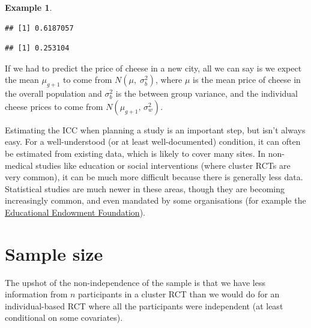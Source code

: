 \documentclass[
  openany]{book}
\newenvironment{Shaded}{\begin{snugshade}}{\end{snugshade}}
\newcommand{\FunctionTok}[1]{\textcolor[rgb]{0.13,0.29,0.53}{\textbf{#1}}}
\newcommand{\NormalTok}[1]{#1}
\newcommand{\OtherTok}[1]{\textcolor[rgb]{0.56,0.35,0.01}{#1}}
\newcommand{\SpecialCharTok}[1]{\textcolor[rgb]{0.81,0.36,0.00}{\textbf{#1}}}
\theoremstyle{definition}
\theoremstyle{definition}
\newtheorem{example}{Example}[chapter]
\theoremstyle{definition}
\theoremstyle{definition}
\theoremstyle{remark}
\begin{document}
\begin{example}
\begin{verbatim}
## [1] 0.6187057
\end{verbatim}

\begin{Shaded}
\end{Shaded}

\begin{verbatim}
## [1] 0.253104
\end{verbatim}

If we had to predict the price of cheese in a new city, all we can say is we expect the mean \(\mu_{g+1}\) to come from \(N\left(\mu,\;\sigma^2_b\right)\), where \(\mu\) is the mean price of cheese in the overall population and \(\sigma^2_b\) is the between group variance, and the individual cheese prices to come from \(N\left(\mu_{g+1},\,\sigma^2_w\right)\).
\end{example}

Estimating the ICC when planning a study is an important step, but isn't always easy. For a well-understood (or at least well-documented) condition, it can often be estimated from existing data, which is likely to cover many sites. In non-medical studies like education or social interventions (where cluster RCTs are very common), it can be much more difficult because there is generally less data. Statistical studies are much newer in these areas, though they are becoming increasingly common, and even mandated by some organisations (for example the \href{https://educationendowmentfoundation.org.uk}{Educational Endowment Foundation}).

\section{Sample size}\label{sample-size}

The upshot of the non-independence of the sample is that we have less information from \(n\) participants in a cluster RCT than we would do for an individual-based RCT where all the participants were independent (at least conditional on some covariates).
\end{document}
